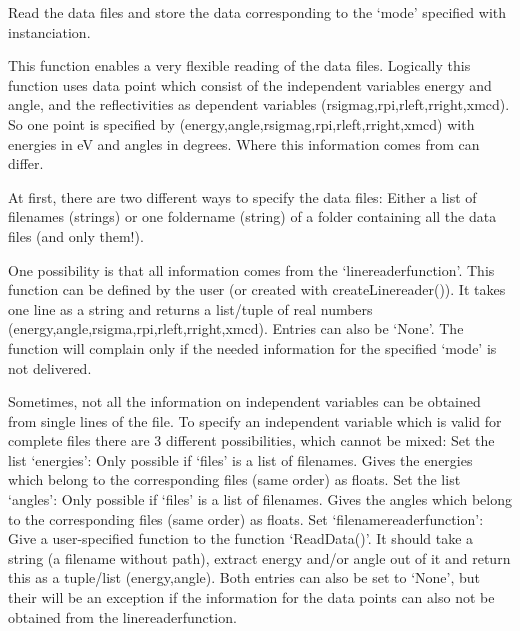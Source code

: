 \documentclass[letterpaper,10pt,english]{sphinxmanual}
\begin{document}
\begin{fulllineitems}
\begin{fulllineitems}
\end{fulllineitems}


\begin{fulllineitems}
\label{\detokenize{modules-api/experiment:Experiment.ReflDataSimulator.ReadData}}
Read the data files and store the data corresponding to the ‘mode’ specified with instanciation.

This function enables a very flexible reading of the data files.
Logically this function uses data point which consist of the independent variables energy and angle, and the reflectivities as dependent variables (rsigmag,rpi,rleft,rright,xmcd).
So one point is specified by (energy,angle,rsigmag,rpi,rleft,rright,xmcd)  with energies in eV and angles in degrees.
Where this information comes from can differ.

At first, there are two different ways to specify the data files: Either a list of filenames (strings) or one foldername (string) of a folder containing all the data files (and only them!).

One possibility is that all information comes from the ‘linereaderfunction’. This function can be defined by the user (or created with createLinereader()).
It takes one line as a string and returns a list/tuple of real numbers (energy,angle,rsigma,rpi,rleft,rright,xmcd). Entries can also be ‘None’. The function will complain only if the needed information for the specified ‘mode’ is not delivered.

Sometimes, not all the information on independent variables can be obtained from single lines of the file. To specify an independent variable which is valid for complete files there are 3 different possibilities, which cannot be mixed:
Set the list ‘energies’: Only possible if ‘files’ is a list of filenames. Gives the energies which belong to the corresponding files (same order) as floats.
Set the list ‘angles’: Only possible if ‘files’ is a list of filenames. Gives the angles which belong to the corresponding files (same order) as floats.
Set ‘filenamereaderfunction’: Give a user-specified function to the function ‘ReadData()’. It should take a string (a filename without path), extract energy and/or angle out of it and return this as a tuple/list (energy,angle). Both entries can also be set to ‘None’, but their will be an exception if the information for the data points can also not be obtained from the linereaderfunction.


\end{fulllineitems}
\end{fulllineitems}
\end{document}
